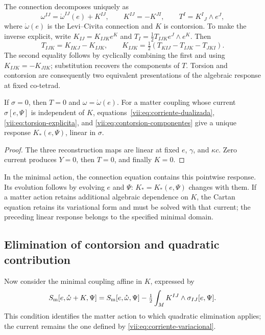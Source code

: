 The connection decomposes uniquely as
\begin{equation}
 \omega^{IJ}=\mathring\omega^{IJ}(e)+K^{IJ},\qquad
 K^{IJ}=-K^{JI},\qquad T^I=K^I{}_{J}\wedge e^J,
 \label{vii:eq:contorsion}
\end{equation}
where \(\mathring\omega(e)\) is the Levi--Civita connection
and \(K\) is contorsion. To make the inverse explicit, write
\(K_{IJ}=K_{IJK}e^K\) and
\(T_I=\tfrac12T_{IJK}e^J\wedge e^K\). Then
\begin{equation}
 T_{IJK}=K_{IKJ}-K_{IJK},\qquad
 K_{IJK}=\tfrac12(T_{KIJ}-T_{IJK}-T_{JKI}).
 \label{vii:eq:contorsion-componentes}
\end{equation}
The second equality follows by cyclically combining the first and
using \(K_{IJK}=-K_{JIK}\); substitution recovers the components
of \(T\). Torsion and contorsion are consequently two equivalent
presentations of the algebraic response at fixed co-tetrad.

\begin{corollary}
\label{vii:cor:desacoplamiento-torsional}
If \(\sigma=0\), then \(T=0\) and
\(\omega=\mathring\omega(e)\). For a matter coupling whose
current \(\sigma[e,\Psi]\) is independent of \(K\),
equations~\eqref{vii:eq:corriente-dualizada},
\eqref{vii:eq:torsion-explicita}, and
\eqref{vii:eq:contorsion-componentes} give a unique response
\(K_*(e,\Psi)\), linear in \(\sigma\).
\end{corollary}
\begin{proof}
The three reconstruction maps are linear at fixed \(e\),
\(\gamma\), and \(\kappa c\). Zero current produces
\(Y=0\), then \(T=0\), and finally \(K=0\).
\end{proof}

In the minimal action, the connection equation contains this pointwise
response. Its evolution follows by evolving \(e\) and \(\Psi\):
\(K_*=K_*(e,\Psi)\) changes with them. If a matter action retains
additional algebraic dependence on \(K\), the Cartan equation
retains its variational form and must be solved with that current;
the preceding linear response belongs to the specified minimal domain.

\subsection{Elimination of contorsion and quadratic contribution}
\label{vii:subsec:respuesta-cuadratica}

Now consider the minimal coupling affine in \(K\), expressed by
\begin{equation}
 S_{\rm m}[e,\mathring\omega+K,\Psi]
 =S_{\rm m}[e,\mathring\omega,\Psi]
   -\tfrac12\int_M K^{IJ}\wedge\sigma_{IJ}[e,\Psi].
 \label{vii:eq:materia-afin-contorsion}
\end{equation}
This condition identifies the matter action to which quadratic
elimination applies; the current remains the one defined by
\eqref{vii:eq:corriente-variacional}.

